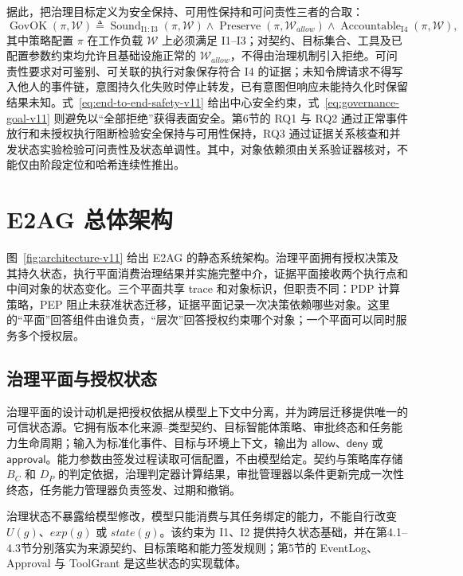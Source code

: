 据此，把治理目标定义为安全保持、可用性保持和可问责性三者的合取：
\begin{equation}
\operatorname{GovOK}(\pi,\mathcal{W})\triangleq
\operatorname{Sound}_{\mathrm{I1:I3}}(\pi,\mathcal{W})\land
\operatorname{Preserve}(\pi,\mathcal{W}_{allow})\land
\operatorname{Accountable}_{\mathrm{I4}}(\pi,\mathcal{W}),
\label{eq:governance-goal-v11}
\end{equation}
其中策略配置 $\pi$ 在工作负载 $\mathcal{W}$ 上必须满足 I1--I3；对契约、目标集合、工具及已配置参数约束均允许且基础设施正常的 $\mathcal{W}_{allow}$，不得由治理机制引入拒绝。可问责性要求对可鉴别、可关联的执行对象保存符合 I4 的证据；未知令牌请求不得写入他人的事件链，意图持久化失败时停止转发，已有意图但响应未能持久化时保留结果未知。式~\eqref{eq:end-to-end-safety-v11} 给出中心安全约束，式~\eqref{eq:governance-goal-v11} 则避免以“全部拒绝”获得表面安全。第6节的 RQ1 与 RQ2 通过正常事件放行和未授权执行阻断检验安全保持与可用性保持，RQ3 通过证据关系核查和并发状态实验检验可问责性及状态单调性。其中，对象依赖须由关系验证器核对，不能仅由阶段定位和哈希连续性推出。

\section{E2AG 总体架构}\label{sec:architecture-v11}



图~\ref{fig:architecture-v11} 给出 E2AG 的静态系统架构。治理平面拥有授权决策及其持久状态，执行平面消费治理结果并实施完整中介，证据平面接收两个执行点和中间对象的状态变化。三个平面共享 trace 和对象标识，但职责不同：PDP 计算策略，PEP 阻止未获准状态迁移，证据平面记录一次决策依赖哪些对象。这里的“平面”回答组件由谁负责，“层次”回答授权约束哪个对象；一个平面可以同时服务多个授权层。

\subsection{治理平面与授权状态}

治理平面的设计动机是把授权依据从模型上下文中分离，并为跨层迁移提供唯一的可信状态源。它拥有版本化来源--类型契约、目标智能体策略、审批终态和任务能力生命周期；输入为标准化事件、目标与环境上下文，输出为 $\mathsf{allow}$、$\mathsf{deny}$ 或 $\mathsf{approval}$。能力参数由签发过程读取可信配置，不由模型给定。契约与策略库存储 $B_C$ 和 $D_P$ 的判定依据，治理判定器计算结果，审批管理器以条件更新完成一次性终态，任务能力管理器负责签发、过期和撤销。

治理状态不暴露给模型修改，模型只能消费与其任务绑定的能力，不能自行改变 $U(g)$、$exp(g)$ 或 $state(g)$。该约束为 I1、I2 提供持久状态基础，并在第4.1--4.3节分别落实为来源契约、目标策略和能力签发规则；第5节的 EventLog、Approval 与 ToolGrant 是这些状态的实现载体。

